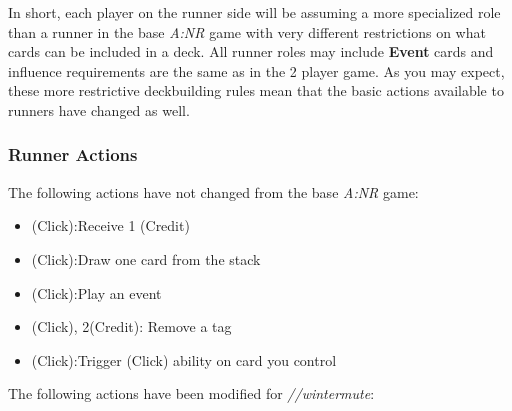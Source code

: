 \documentclass[titlepage]{article}
\begin{document}
In short, each player on the runner side will be assuming a more specialized role than a runner in the base \emph{A:NR} game with very different restrictions on what cards can be included in a deck. All runner roles may include \textbf{Event} cards and influence requirements are the same as in the 2 player game. As you may expect, these more restrictive deckbuilding rules mean that the basic actions available to runners have changed as well.

\subsubsection{Runner Actions}

The following actions have not changed from the base \emph{A:NR} game:

\begin{itemize}
	\item (Click):Receive 1 (Credit)
	\item (Click):Draw one card from the stack
	\item (Click):Play an event
	\item (Click), 2(Credit): Remove a tag
	\item (Click):Trigger (Click) ability on card you control
\end{itemize}

The following actions have been modified for \emph{//wintermute}:
\end{document}
